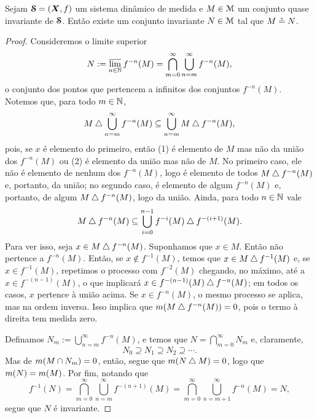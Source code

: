 \begin{proposition}\label{prop:quase.inv}
Sejam $\bm{\mathcal{S}} = (\bm X,f)$ um sistema dinâmico de medida e $M \in \mathcal{M}$ um conjunto quase invariante de $\bm {\mathcal{S}}$. Então existe um conjunto invariante $N \in \mathcal{M}$ tal que $M \circeq N$.
\end{proposition}
\begin{proof}
Consideremos o limite superior
	\begin{equation*}
	N := \varlimsup_{n \in \mathbb{N}} f^{-n}(M) = \bigcap_{m=0}^{\infty} \bigcup_{n=m}^\infty f^{-n}(M),
	\end{equation*}
o conjunto dos pontos que pertencem a infinitos dos conjuntos $f^{-n}(M)$. Notemos que, para todo $m \in \mathbb{N}$,
	\begin{equation*}
	M \mathbin{\triangle} \bigcup_{n=m}^\infty f^{-n}(M) \subseteq \bigcup_{n=m}^\infty M \mathbin{\triangle} f^{-n}(M),
	\end{equation*}
pois, se $x$ é elemento do primeiro, então (1) é elemento de $M$ mas não da união dos $f^{-n}(M)$ ou (2) é elemento da união mas não de $M$. No primeiro caso, ele não é elemento de nenhum dos $f^{-n}(M)$, logo é elemento de todos $M \mathbin{\triangle} f^{-n}(M)$ e, portanto, da união; no segundo caso, é elemento de algum $f^{-n}(M)$ e, portanto, de algum $M \mathbin{\triangle} f^{-n}(M)$, logo da união. Ainda, para todo $n \in \mathbb{N}$ vale
	\begin{equation*}
	M \mathbin{\triangle} f^{-n}(M) \subseteq \bigcup_{i=0}^{n-1} f^{-i}(M) \mathbin{\triangle} f^{-(i+1)}(M).
	\end{equation*}
Para ver isso, seja $x \in M \mathbin{\triangle} f^{-n}(M)$. Suponhamos que $x \in M$. Então não pertence a $f^{-n}(M)$. Então, se $x \notin f^{-1}(M)$, temos que $x \in M \mathbin{\triangle} f^{-1}(M)$ e, se $x \in f^{-1}(M)$, repetimos o processo com $f^{-2}(M)$ chegando, no máximo, até a $x \in f^{-(n-1)}(M)$, o que implicará $x \in f^{-(n-1)}(M) \mathbin{\triangle} f^{-n}(M)$; em todos os casos, $x$ pertence à união acima. Se $x \in f^{-n}(M)$, o mesmo processo se aplica, mas na ordem inversa. Isso implica que  $m(M \mathbin{\triangle} f^{-n}(M))=0$, pois o termo à direita tem medida zero.

	Definamos $N_m := \bigcup_{n=m}^\infty f^{-n}(M)$, e temos que $N = \bigcap_{m=0}^\infty N_m$ e, claramente,
	\begin{equation*}
	N_0 \supseteq N_1 \supseteq N_2 \supseteq \cdots.
	\end{equation*}
Mas de $m(M \cap N_m)=0$, então, segue que $m(N \mathbin{\triangle} M)=0$, logo que $m(N)=m(M)$. Por fim, notando que
	\begin{equation*}
	f^{-1}(N) = \bigcap_{m=0}^{\infty} \bigcup_{n=m}^\infty f^{-(n+1)}(M) = \bigcap_{m=0}^{\infty} \bigcup_{n=m+1}^\infty f^{-n}(M)=N,
	\end{equation*}
segue que $N$ é invariante.
\end{proof}


